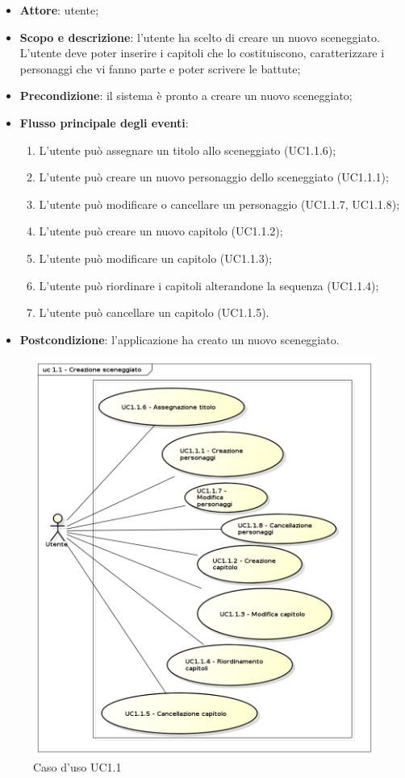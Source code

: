 \begin{itemize}
\item \textbf{Attore}: utente;
\item \textbf{Scopo e descrizione}: l'utente ha scelto di creare un nuovo sceneggiato. L'utente deve poter inserire i capitoli che lo costituiscono, caratterizzare i personaggi che vi fanno parte e poter scrivere le battute;
\item \textbf{Precondizione}: il sistema è pronto a creare un nuovo sceneggiato;
\item \textbf{Flusso principale degli eventi}:
\begin{enumerate}
\item L'utente può assegnare un titolo allo sceneggiato (UC1.1.6);
\item L'utente può creare un nuovo personaggio dello sceneggiato (UC1.1.1);
\item L'utente può modificare o cancellare un personaggio (UC1.1.7, UC1.1.8);
\item L'utente può creare un nuovo capitolo (UC1.1.2);
\item L'utente può modificare un capitolo (UC1.1.3);
\item L'utente può riordinare i capitoli alterandone la sequenza (UC1.1.4);
\item L'utente può cancellare un capitolo (UC1.1.5).
\end{enumerate}
\item \textbf{Postcondizione}: l'applicazione ha creato un nuovo sceneggiato.
\end{itemize}

\begin{figure}[htbp]
\centering
\includegraphics[scale=0.5]{immagini/uc1_1_creazione_sceneggiato.png}
\captionsetup{labelfont=bf}
\caption{Caso d'uso UC1.1}
\end{figure}
\newpage

